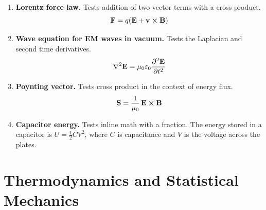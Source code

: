 \documentclass[11pt]{article}
\begin{document}
\begin{enumerate}
\item \textbf{Lorentz force law.}
Tests addition of two vector terms with a cross product.
\[
  \vb{F} = q(\vb{E} + \vb{v} \cross \vb{B})
\]

\item \textbf{Wave equation for EM waves in vacuum.}
Tests the Laplacian and second time derivatives.
\[
  \laplacian \vb{E} = \mu_0 \varepsilon_0 \pdv[2]{\vb{E}}{t}
\]

\item \textbf{Poynting vector.}
Tests cross product in the context of energy flux.
\[
  \vb{S} = \frac{1}{\mu_0}\,\vb{E} \cross \vb{B}
\]

\item \textbf{Capacitor energy.}
Tests inline math with a fraction.
The energy stored in a capacitor is $U = \frac{1}{2}CV^2$, where $C$ is
capacitance and $V$ is the voltage across the plates.

\end{enumerate}

\section{Thermodynamics and Statistical Mechanics}
\end{document}
